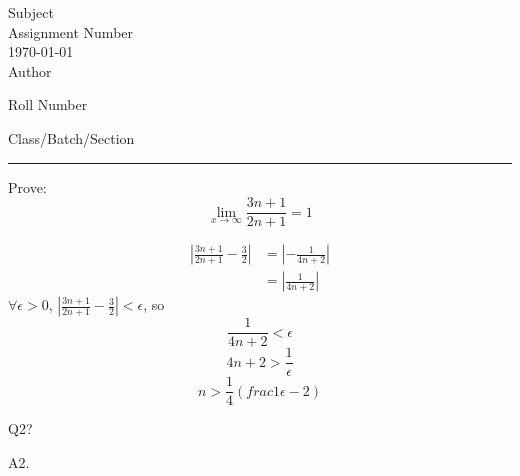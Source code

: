 \documentclass[12pt,letterpaper, onecolumn]{exam}
\begin{document}
\begingroup  
    \centering
    \LARGE Subject\\
    \LARGE Assignment Number\\[0.5em]
    \large \today\\[0.5em]
    \large Author\par
    \large Roll Number\par
    \large Class/Batch/Section\par
\endgroup
\rule{\textwidth}{0.4pt}
\pointsdroppedatright   %
\printanswers
\renewcommand{\solutiontitle}{\noindent\textbf{Ans:}\enspace}   %

\begin{questions}

    \question[1 Mark] Prove: \[ \lim_{x\to\infty}\frac{3n+1}{2n+1} = 1 \]\droppoints

    \begin{solution}
        \begin{align*}
            \left| \frac{3n+1}{2n+1} - \frac32 \right| &= \left| - \frac1{4n+2} \right|\\
            &= \left| \frac1{4n+2} \right|
        \end{align*}
        $\forall \epsilon > 0$, $| \frac{3n+1}{2n+1} - \frac32 | < \epsilon$, so
        \begin{equation*}
            \frac1{4n+2} < \epsilon
        \end{equation*}
        \begin{equation*}
            4n + 2 > \frac{1}{\epsilon}
        \end{equation*}
        \begin{equation*}
            n > \frac14 \left( frac{1}{\epsilon} - 2 \right)
        \end{equation*}
    \end{solution}
    
    \question[2 Marks] Q2?
    
    \begin{solution}
            A2.
        \begin{parts}

\end{parts}
\end{solution}
\end{questions}
\end{document}
